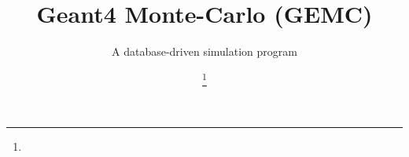 \documentclass{webofc}
\begin{document}
%
\title{Geant4 Monte-Carlo (GEMC)}
\subtitle{A database-driven simulation program} %
%
\author{ \fnsep\thanks{}}
%
%

%
\maketitle
%




\end{document}
